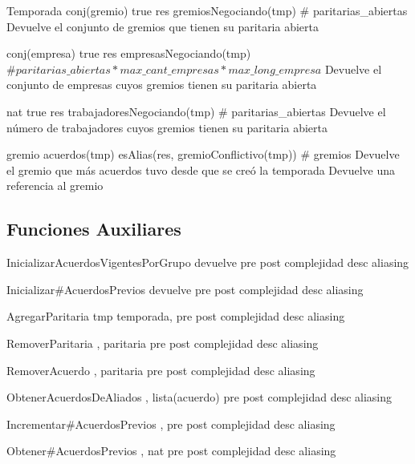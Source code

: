 \begin{interfaz}{Temporada}
{}{conj(gremio)}
{true}
{res \igobs gremiosNegociando(tmp)}
{\# paritarias\_abiertas}
{Devuelve el conjunto de gremios que tienen su paritaria abierta }
{}

{}{conj(empresa)}
{true}
{res \igobs empresasNegociando(tmp)}
{ \ensuremath{\#paritarias\_abiertas * max\_cant\_empresas * max\_long\_empresa }}
{Devuelve el conjunto de empresas cuyos gremios tienen su paritaria abierta}
{}

{}{nat}
{true}
{res \igobs trabajadoresNegociando(tmp)}
{\# paritarias\_abiertas}
{Devuelve el n\'umero de trabajadores cuyos gremios tienen su paritaria abierta}
{}

{}
{gremio}
{\emptyset \neq acuerdos(tmp)}
{ esAlias(res, gremioConflictivo(tmp))}
{\# gremios}
{Devuelve el gremio que m\'as acuerdos tuvo desde que se cre\'o la temporada }
{Devuelve una referencia al gremio}

\subsection{Funciones Auxiliares}

\operacion
{InicializarAcuerdosVigentesPorGrupo}
{}
{devuelve}
{pre}
{post}
{complejidad}
{desc}
{aliasing}


\operacion
{Inicializar\#AcuerdosPrevios}
{}
{devuelve}
{pre}
{post}
{complejidad}
{desc}
{aliasing}


\operacion
{AgregarParitaria}
{
{tmp}
{temporada}, }
{}
{pre}
{post}
{complejidad}
{desc}
{aliasing}


\operacion
{RemoverParitaria}
{, }
{paritaria}
{pre}
{post}
{complejidad}
{desc}
{aliasing}


\operacion
{RemoverAcuerdo}
{, }
{paritaria}
{pre}
{post}
{complejidad}
{desc}
{aliasing}


\operacion
{ObtenerAcuerdosDeAliados}
{, }
{lista(acuerdo)}
{pre}
{post}
{complejidad}
{desc}
{aliasing}

\operacion
{Incrementar\#AcuerdosPrevios}
{, }
{}
{pre}
{post}
{complejidad}
{desc}
{aliasing}

\operacion
{Obtener\#AcuerdosPrevios}
{, }
{nat}
{pre}
{post}
{complejidad}
{desc}
{aliasing}

\end{interfaz}
